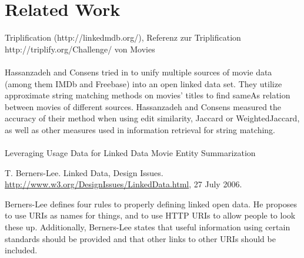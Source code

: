 \section{Related Work}
\label{sec_related_work}


Triplification (http://linkedmdb.org/), Referenz zur Triplification http://triplify.org/Challenge/ von Movies\\\\

Hassanzadeh and Consens tried in \cite{LMDB} to unify multiple sources of movie data (among them IMDb and Freebase) into an open linked data set.
They utilize approximate string matching methods on movies' titles to find sameAs relation between movies of different sources.
Hassanzadeh and Consens measured the accuracy of their method when using edit similarity, Jaccard or WeightedJaccard, as well as other measures used in information retrieval for string matching.\\\\

Leveraging Usage Data for Linked Data Movie Entity Summarization 
\cite{MovieSummarization}

T. Berners-Lee. Linked Data, Design Issues.
\url{http://www.w3.org/DesignIssues/LinkedData.html}, 27 July 2006.

Berners-Lee defines four rules to properly defining linked open data.
He proposes to use URIs as names for things, and to use HTTP URIs to allow people to look these up.
Additionally, Berners-Lee states that useful information using certain standards should be provided and that other links to other URIs should be included.

